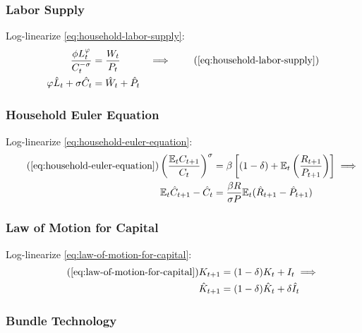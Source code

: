\documentclass[
	12pt,
	]{article}
\numberwithin{equation}{section}
\newcommand{\E}[1][t]{{\mathbb{E}_{#1}}}
\theoremstyle{definition}
\theoremstyle{plain}
\theoremstyle{plain}
\theoremstyle{plain}
\begin{document}

\subsubsection{Labor Supply}

Log-linearize \ref{eq:household-labor-supply}:
\begin{alignat}{2}
	\frac{\phi L_t^{\varphi}}{C_t^{-\sigma}} &= \frac{W_t}{P_t} & \implies \tag{\ref{eq:household-labor-supply}} \\
	\varphi \hat{L}_t + \sigma \hat{C}_t &= \hat{W}_t + \hat{P}_t & \label{eq:ll-labor-supply}
\end{alignat}


\subsubsection{Household Euler Equation}

Log-linearize \ref{eq:household-euler-equation}:
\begin{align}
\tag{\ref{eq:household-euler-equation}}
	\left( \frac{\mathbb{E}_t C_{t+1}}{C_t} \right)^\sigma &= \beta \left[ (1-\delta) + \mathbb{E}_t \left(\frac{R_{t+1}}{P_{t+1}}\right) \right] \implies \\
\label{eq:ll-household-euler-equation}
	\E \hat{C}_{t+1} - \hat{C}_t &= \frac{\beta R}{\sigma P} \E(\hat{R}_{t+1} - \hat{P}_{t+1})
\end{align}


\subsubsection{Law of Motion for Capital}

Log-linearize \ref{eq:law-of-motion-for-capital}:
\begin{align}
\tag{\ref{eq:law-of-motion-for-capital}}
	K_{t+1} &= (1-\delta)K_t + I_t \implies \\
\label{eq:ll-law-of-motion-for-capital}
	\hat{K}_{t+1} &= (1-\delta)\hat{K}_t + \delta \hat{I}_t
\end{align}


\subsubsection{Bundle Technology}
\end{document}
